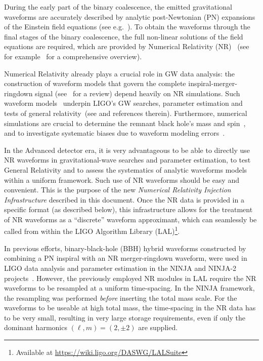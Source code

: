 \documentclass[11pt,tightenlines,article,amssymb,amsmath,amsfonts,superscriptaddress,nofootinbib]{revtex4}
\begin{document}
During the early part of the binary coalescence, the emitted gravitational waveforms are accurately described by
analytic post-Newtonian (PN) expansions of the Einstein field equations (see e.g.~\cite{lrr-2014-2}). 
To obtain the waveforms through the final stages of the binary coalescence, the full non-linear solutions
of the field equations are required, which are provided by Numerical Relativity (NR)~\cite{Pretorius:2005gq, Baker:2005vv, Campanelli:2005dd} (see for example~\cite{Centrella:2010mx} for a comprehensive overview).

Numerical Relativity already plays a crucial role in GW data analysis: the construction of waveform models that govern the complete inspiral-merger-ringdown signal (see~\cite{Ohme:2011rm} for a review) depend heavily on NR simulations. Such waveform models~\cite{Hannam:2013oca, Pan:2013rra, Taracchini:2013rva, Khan:2015jqa} underpin LIGO's GW searches, parameter estimation and tests of general relativity~(see \cite{Abbott:2016blz} and references therein). Furthermore, numerical simulations are crucial to determine the remnant black hole's mass and spin~\cite{Healy:2014yta}, and to investigate systematic biases due to waveform modeling errors~\cite{Abbott:2016wiq}.

In the Advanced detector era, it is very advantageous to be able to directly use NR waveforms in gravitational-wave searches and parameter estimation, to test General Relativity and to assess the systematics of analytic waveforms models within a uniform framework. Such use of NR waveforms should be easy and convenient.
This is the purpose of the new \emph{Numerical Relativity Injection Infrastructure} described in this document. Once the NR data is provided in a specific format (as described below), this infrastructure allows for the treatment of
NR waveforms as a ``discrete'' waveform approximant, which can seamlessly be called from within the LIGO Algorithm Library (LAL)\footnote{Available at \url{https://wiki.ligo.org/DASWG/LALSuite}}.

In previous efforts, binary-black-hole (BBH) hybrid waveforms constructed by combining a PN inspiral with an NR merger-ringdown waveform, were used in LIGO data analysis and parameter estimation in the NINJA and NINJA-2 projects~\cite{Aylott:2009ya, Aasi:2014tra}.  
However, the previously employed NR modules in LAL
require the NR waveforms to be resampled at a uniform time-spacing. In the NINJA framework, the resampling was performed \emph{before} inserting the total mass scale. For the waveforms to be
useable at high total mass, the time-spacing in the NR data has to be very small, resulting in very large storage requirements, even if only the dominant harmonics $(\ell,m)=(2,\pm 2)$ are supplied.
\end{document}
